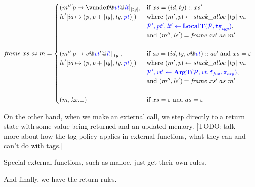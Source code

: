 \documentclass{llncs}
\begin{document}
\begin{table}[t]
\[\mathit{frame} ~ xs ~ as ~ \mem =
\begin{cases}
  (\mem''[p \mapsto \vundef@\vt@\lt]_{|ty|}, & \textnormal{if } xs = (id,ty)::xs' \\
  \lenv'[id \mapsto (\mathit{p, p+|ty|,ty,\pt})]) &
  \textnormal{where } (\mem',p) \leftarrow \mathit{stack\_alloc} ~ |ty| ~ \mem, \\
  & \trule{\localtres}{\localt}, \\
  & \textnormal{and } (\mem'',\lenv') = \mathit{frame} ~ xs' ~ as ~ m' \\ 
  \\
  (\mem''[p \mapsto v@\vt'@\lt]_{|ty|}, & \textnormal{if } as = (id,ty,v @ \vt)::as' \textnormal{ and } xs = \varepsilon \\
  \lenv'[id \mapsto (\mathit{p, p+|ty|,ty,\pt})]) &
  \textnormal{where } (\mem',p) \leftarrow \mathit{stack\_alloc} ~ |ty| ~ \mem, \\
  & \trule{\argtres}{\argt}, \\
  & \textnormal{and } (\mem'',\lenv') = \mathit{frame} ~ xs' ~ as ~ m' \\
  \\
  (\mem, \lambda x . \bot) & \textnormal{if } xs = \varepsilon \textnormal{ and } as = \varepsilon \\
\end{cases}\]

\callstep

On the other hand, when we make an external call, we step directly to a return state with some value
being returned and an updated memory. [TODO: talk more about how the tag policy applies in external
  functions, what they can and can't do with tags.]

\extcallstep

Special external functions, such as malloc, just get their own rules.

\mallocstep

And finally, we have the return rules.

\returnstep
\retvalstep
\retnovalstep


  

\end{table}
\end{document}
